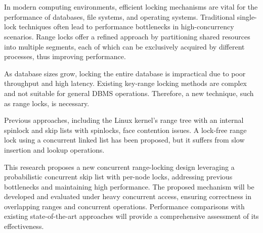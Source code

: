 \chapter{\abstractname}

In modern computing environments, efficient locking mechanisms are vital for the performance of databases, file systems, and operating systems. Traditional single-lock techniques often lead to performance bottlenecks in high-concurrency scenarios. Range locks offer a refined approach by partitioning shared resources into multiple segments, each of which can be exclusively acquired by different processes, thus improving performance.

As database sizes grow, locking the entire database is impractical due to poor throughput and high latency. Existing key-range locking methods are complex and not suitable for general DBMS operations. Therefore, a new technique, such as range locks, is necessary.

Previous approaches, including the Linux kernel's range tree with an internal spinlock and skip lists with spinlocks, face contention issues. A lock-free range lock using a concurrent linked list has been proposed, but it suffers from slow insertion and lookup operations.

This research proposes a new concurrent range-locking design leveraging a probabilistic concurrent skip list with per-node locks, addressing previous bottlenecks and maintaining high performance. The proposed mechanism will be developed and evaluated under heavy concurrent access, ensuring correctness in overlapping ranges and concurrent operations. Performance comparisons with existing state-of-the-art approaches will provide a comprehensive assessment of its effectiveness.


